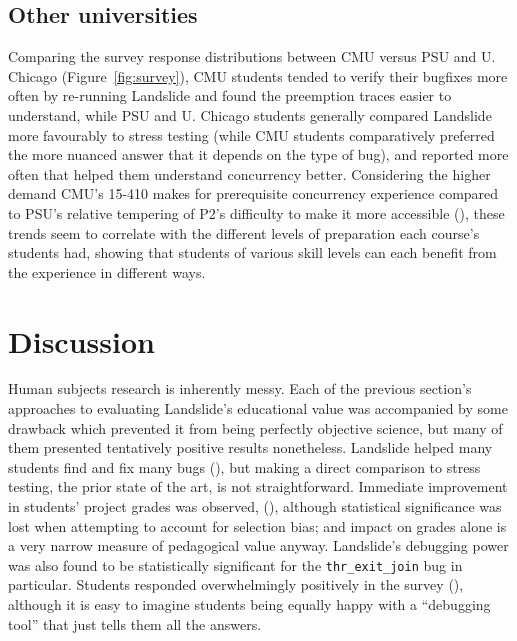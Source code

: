 \subsection{Other universities}

Comparing the survey response distributions between CMU versus PSU and U. Chicago (Figure~\ref{fig:survey}),
CMU students tended to verify their bugfixes more often by re-running Landslide
and found the preemption traces easier to understand,
while PSU and U. Chicago students generally compared Landslide more favourably to stress testing
(while CMU students comparatively preferred the more nuanced answer that it depends on the type of bug),
and reported more often that helped them understand concurrency better.
Considering the higher demand CMU's 15-410 makes for prerequisite concurrency experience
compared to PSU's relative tempering of P2's difficulty to make it more accessible (\sect{\ref{sec:pebbles}}),
these trends seem to correlate with the different levels of preparation each course's students had,
showing that students of various skill levels
can each benefit from the experience in different ways.




\section{Discussion}

Human subjects research is inherently messy.
Each of the previous section's approaches to evaluating Landslide's educational value
was accompanied by some drawback which prevented it from being perfectly objective science,
but many of them presented tentatively positive results nonetheless.
Landslide helped many students find and fix many bugs (\sect{\ref{sec:education-eval-bugfinding}}),
but making a direct comparison to stress testing, the prior state of the art, is not straightforward.
Immediate improvement in students' project grades was observed,
(\sect{\ref{sec:education-eval-grades}}),
although statistical significance was lost when attempting to account for selection bias;
and impact on grades alone is a very narrow measure of pedagogical value anyway.
Landslide's debugging power was also found to be statistically significant
for the {\tt thr\_exit\_join} bug in particular.
Students responded overwhelmingly positively in the survey (\sect{\ref{sec:education-eval-survey}}),
although it is easy to imagine students being equally happy with a ``debugging tool'' that just tells them all the answers.

